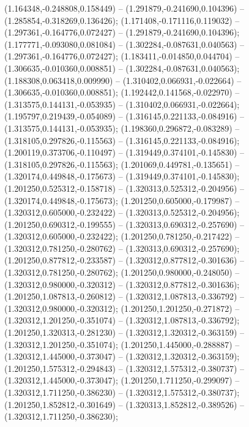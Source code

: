  (1.164348,-0.248808,0.158449) -- (1.291879,-0.241690,0.104396) -- (1.285854,-0.318269,0.136426);
 (1.171408,-0.171116,0.119032) -- (1.297361,-0.164776,0.072427) -- (1.291879,-0.241690,0.104396);
 (1.177771,-0.093080,0.081084) -- (1.302284,-0.087631,0.040563) -- (1.297361,-0.164776,0.072427);
 (1.183411,-0.014850,0.044704) -- (1.306635,-0.010360,0.008851) -- (1.302284,-0.087631,0.040563);
 (1.188308,0.063418,0.009990) -- (1.310402,0.066931,-0.022664) -- (1.306635,-0.010360,0.008851);
 (1.192442,0.141568,-0.022970) -- (1.313575,0.144131,-0.053935) -- (1.310402,0.066931,-0.022664);
 (1.195797,0.219439,-0.054089) -- (1.316145,0.221133,-0.084916) -- (1.313575,0.144131,-0.053935);
 (1.198360,0.296872,-0.083289) -- (1.318105,0.297826,-0.115563) -- (1.316145,0.221133,-0.084916);
 (1.200119,0.373706,-0.110497) -- (1.319449,0.374101,-0.145830) -- (1.318105,0.297826,-0.115563);
 (1.201069,0.449781,-0.135651) -- (1.320174,0.449848,-0.175673) -- (1.319449,0.374101,-0.145830);
 (1.201250,0.525312,-0.158718) -- (1.320313,0.525312,-0.204956) -- (1.320174,0.449848,-0.175673);
 (1.201250,0.605000,-0.179987) -- (1.320312,0.605000,-0.232422) -- (1.320313,0.525312,-0.204956);
 (1.201250,0.690312,-0.199555) -- (1.320313,0.690312,-0.257690) -- (1.320312,0.605000,-0.232422);
 (1.201250,0.781250,-0.217422) -- (1.320312,0.781250,-0.280762) -- (1.320313,0.690312,-0.257690);
 (1.201250,0.877812,-0.233587) -- (1.320312,0.877812,-0.301636) -- (1.320312,0.781250,-0.280762);
 (1.201250,0.980000,-0.248050) -- (1.320312,0.980000,-0.320312) -- (1.320312,0.877812,-0.301636);
 (1.201250,1.087813,-0.260812) -- (1.320312,1.087813,-0.336792) -- (1.320312,0.980000,-0.320312);
 (1.201250,1.201250,-0.271872) -- (1.320312,1.201250,-0.351074) -- (1.320312,1.087813,-0.336792);
 (1.201250,1.320313,-0.281230) -- (1.320312,1.320312,-0.363159) -- (1.320312,1.201250,-0.351074);
 (1.201250,1.445000,-0.288887) -- (1.320312,1.445000,-0.373047) -- (1.320312,1.320312,-0.363159);
 (1.201250,1.575312,-0.294843) -- (1.320312,1.575312,-0.380737) -- (1.320312,1.445000,-0.373047);
 (1.201250,1.711250,-0.299097) -- (1.320312,1.711250,-0.386230) -- (1.320312,1.575312,-0.380737);
 (1.201250,1.852812,-0.301649) -- (1.320313,1.852812,-0.389526) -- (1.320312,1.711250,-0.386230);
